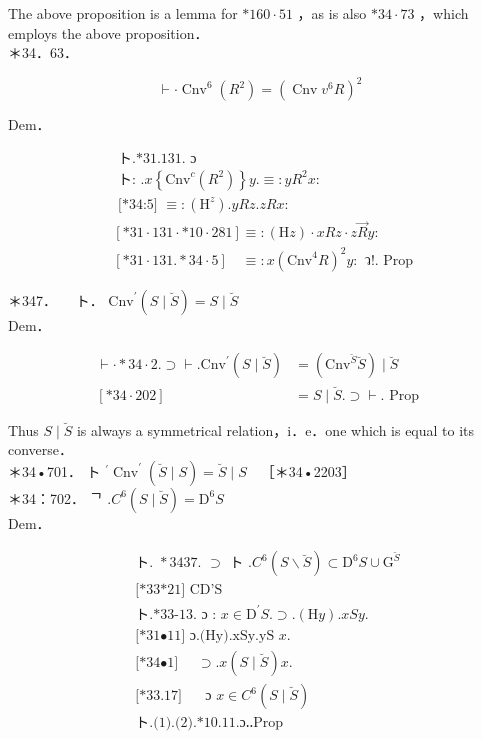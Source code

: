 \documentclass[10pt]{article}
\begin{document}
The above proposition is a lemma for $* 160 \cdot 51$ ，as is also $* 34 \cdot 73$ ，which employs the above proposition．\\
＊34．63．

$$
\vdash \cdot \operatorname{Cnv}^{6}\left(R^{2}\right)=\left(\operatorname{Cnv} v^{6} R\right)^{2}
$$

Dem．

$$
\begin{aligned}
& \text { ト.*31.131. ɔ } \\
& \text { ト: } . x\left\{\mathrm{Cnv}^{c}\left(R^{2}\right)\right\} y . \equiv: y R^{2} x: \\
& \text { [*34:5] } \equiv:\left(\mathrm{H}^{z}\right) . y R z . z R x: \\
& {[* 31 \cdot 131 \cdot * 10 \cdot 281] \equiv:(\mathrm{H} z) \cdot x R z \cdot z \vec{R} y:} \\
& {[* 31 \cdot 131 . * 34 \cdot 5] \quad \equiv: x\left(\mathrm{Cnv}^{4} R\right)^{2} y: \text { ว!. Prop }}
\end{aligned}
$$

＊347．$\quad$ ト． $\mathrm{Cnv}^{\prime}(S \mid \breve{S})=S \mid \breve{S}$\\
Dem．

$$
\begin{aligned}
\vdash \cdot * 34 \cdot 2 . \supset \vdash . \mathrm{Cnv}^{\prime}(S \mid \breve{S}) & =\left(\mathrm{Cnv}^{\breve{S}} \breve{S}\right) \mid \breve{S} \\
{[* 34 \cdot 202] } & =S \mid \breve{S} . \supset \vdash . \text { Prop }
\end{aligned}
$$

Thus $S \mid \breve{S}$ is always a symmetrical relation，i．e．one which is equal to its converse．\\
＊34•701． ト $^{\prime} \operatorname{Cnv}^{\prime}(\breve{S} \mid S)=\breve{S} \mid S \quad$［＊34•2203］\\
＊34：702． ᄀ $. C^{6}(S \mid \breve{S})=\mathrm{D}^{6} S$\\
Dem．


\begin{align*}
& \text { ト. } * 3437 \text {. } \supset \text { ト } . C^{6}(S \backslash \breve{S}) \subset \mathrm{D}^{6} S \cup \mathrm{G}^{\breve{S}} \\
& \text { [*33*21] CD'S }  \tag{1}\\
& \text { ト.*33-13. ɔ : } x \in \mathrm{D}^{\prime} S . \supset .(\mathrm{H} y) . x S y . \\
& \text { [*31•11] ɔ.(Hy).xSy.yS } x \text {. } \\
& \text { [*34•1] } \quad \supset . x(S \mid \breve{S}) x \text {. } \\
& \text { [*33.17] } \quad \text { ɔ } x \in C^{6}(S \mid \breve{S})  \tag{2}\\
& \text { ト.(1).(2).*10.11.ɔ‥Prop }
\end{align*}
\end{document}
